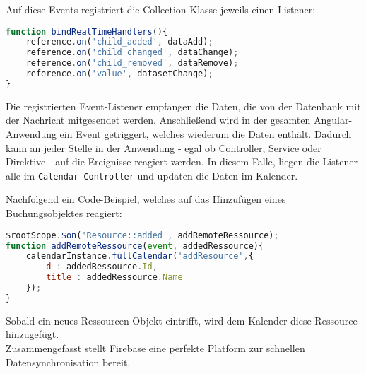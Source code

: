 Auf diese Events registriert die Collection-Klasse jeweils einen Listener:

 \begin{lstlisting}[language=Javascript, label=code_CollectionListenerBnding, caption=Registrierung der Event-Handler von Datenbank-Events]
function bindRealTimeHandlers(){
    reference.on('child_added', dataAdd);
    reference.on('child_changed', dataChange);
    reference.on('child_removed', dataRemove);
    reference.on('value', datasetChange);
}
\end{lstlisting}

Die registrierten Event-Listener empfangen die Daten, die von der Datenbank mit der Nachricht mitgesendet werden. Anschließend wird in der gesamten Angular-Anwendung ein Event getriggert, welches wiederum die Daten enthält. Dadurch kann an jeder Stelle in der Anwendung - egal ob Controller, Service oder Direktive - auf die Ereignisse reagiert werden. In diesem Falle, liegen die Listener alle im \texttt{Calendar-Controller} und updaten die Daten im Kalender.

Nachfolgend ein Code-Beispiel, welches auf das Hinzufügen eines Buchungsobjektes reagiert:

 \begin{lstlisting}[language=Javascript, label=code_CollectionCUtomListener, caption=Event-Handler für hinzukommende Ressourcen]
 $rootScope.$on('Resource::added', addRemoteRessource);
function addRemoteRessource(event, addedRessource){
    calendarInstance.fullCalendar('addResource',{
        d : addedRessource.Id,
        title : addedRessource.Name
    });
}
\end{lstlisting}

Sobald ein neues Ressourcen-Objekt eintrifft, wird dem Kalender diese Ressource hinzugefügt.\\
Zusammengefasst stellt Firebase eine perfekte Platform zur schnellen Datensynchronisation bereit.